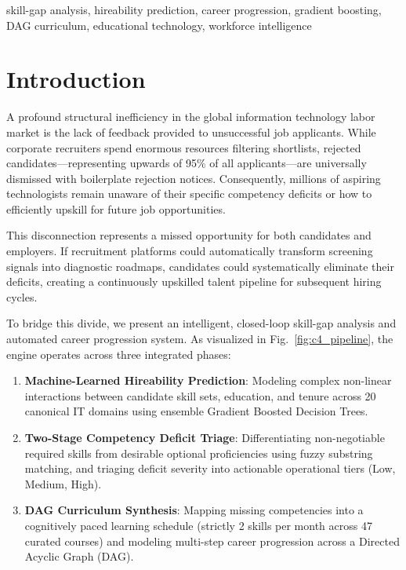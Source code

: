 \documentclass[conference]{IEEEtran}
\begin{document}
\begin{IEEEkeywords}
skill-gap analysis, hireability prediction, career progression, gradient boosting, DAG curriculum, educational technology, workforce intelligence
\end{IEEEkeywords}

\section{Introduction}
A profound structural inefficiency in the global information technology labor market is the lack of feedback provided to unsuccessful job applicants. While corporate recruiters spend enormous resources filtering shortlists, rejected candidates—representing upwards of 95\% of all applicants—are universally dismissed with boilerplate rejection notices. Consequently, millions of aspiring technologists remain unaware of their specific competency deficits or how to efficiently upskill for future job opportunities.

This disconnection represents a missed opportunity for both candidates and employers. If recruitment platforms could automatically transform screening signals into diagnostic roadmaps, candidates could systematically eliminate their deficits, creating a continuously upskilled talent pipeline for subsequent hiring cycles.

To bridge this divide, we present an intelligent, closed-loop skill-gap analysis and automated career progression system. As visualized in Fig.~\ref{fig:c4_pipeline}, the engine operates across three integrated phases:
\begin{enumerate}
    \item \textbf{Machine-Learned Hireability Prediction}: Modeling complex non-linear interactions between candidate skill sets, education, and tenure across 20 canonical IT domains using ensemble Gradient Boosted Decision Trees.
    \item \textbf{Two-Stage Competency Deficit Triage}: Differentiating non-negotiable required skills from desirable optional proficiencies using fuzzy substring matching, and triaging deficit severity into actionable operational tiers (Low, Medium, High).
    \item \textbf{DAG Curriculum Synthesis}: Mapping missing competencies into a cognitively paced learning schedule (strictly 2 skills per month across 47 curated courses) and modeling multi-step career progression across a Directed Acyclic Graph (DAG).
\end{enumerate}
\end{document}
